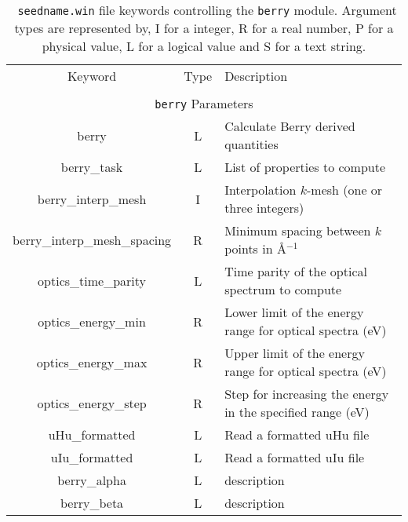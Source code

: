 \begin{table}[hH!]
\begin{center}
\begin{tabular}{|c|c|p{6cm}|}
\hline
Keyword & Type & Description \\
        &      &             \\
\hline\hline
\multicolumn{3}{|c|}{{\tt berry} Parameters} \\
\hline
{\sc berry}  & L & Calculate Berry derived quantities \\
{\sc berry\_task}& L  & List of properties to compute \\
{\sc berry\_interp\_mesh} & I & Interpolation $k$-mesh (one or three integers)\\ 
{\sc berry\_interp\_mesh\_spacing}& R & Minimum spacing between $k$ points in \AA$^{-1}$\\
{\sc optics\_time\_parity}& L & Time parity of the optical spectrum to compute\\ 
{\sc optics\_energy\_min} & R & Lower limit of the energy range for
optical spectra (eV) \\
{\sc optics\_energy\_max}& R & Upper limit of the energy range for
optical spectra (eV) \\
{\sc optics\_energy\_step}& R &  Step for increasing the energy in the specified range (eV)\\
{\sc uHu\_formatted}& L & Read a formatted uHu file \\
{\sc uIu\_formatted}& L & Read a formatted uIu file\\
{\sc berry\_alpha}& L & description\\
{\sc berry\_beta}& L & description\\
\hline
\end{tabular}
\caption[Parameter file keywords controlling the Berry module.]  {{\tt
    seedname.win} file keywords controlling the {\tt berry}
  module. Argument types are represented by, I for a integer, R for a
  real number, P for a physical value, L for a logical value and S for
  a text string.}
\label{parameter_keywords_berry}
\end{center}
\end{table}



